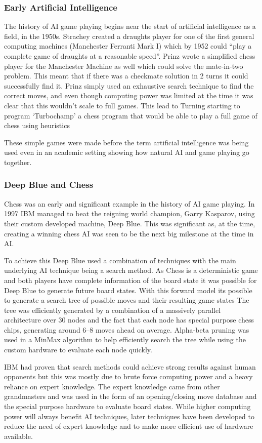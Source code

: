 \documentclass[a4paper]{article}
\begin{document}
\subsubsection{Early Artificial Intelligence}
The history of AI game playing begins near the start of artificial intelligence as a field, in the 1950s.
Strachey created a draughts player for one of the first general computing machines (Manchester Ferranti Mark I) which by  1952 could ``play a complete game of draughts at a reasonable speed''\cite{BreifHistoryComputing}.
Prinz wrote a simplified chess player for the Manchester Machine as well which could solve the mate-in-two problem.
This meant that if there was a checkmate solution in 2 turns it could successfully find it\cite{BreifHistoryComputing}.
Prinz simply used an exhaustive search technique to find the correct moves, and even though computing power was limited at the time it was clear that this wouldn't scale to full games.
This lead to Turning starting to program `Turbochamp' a chess program that would be able to play a full game of chess using heuristics\cite{BreifHistoryComputing}
\par
These simple games were made before the term artificial intelligence was being used even in an academic setting showing how natural AI and game playing go together.

\subsubsection{Deep Blue and Chess}
Chess was an early and significant example in the history of AI game playing.
In 1997 IBM managed to beat the reigning world champion, Garry Kasparov, using their custom developed machine, Deep Blue\cite{deepBlue}.
This was significant as, at the time, creating a winning chess AI was seen to be the next big milestone at the time in AI\@.
\par
To achieve this Deep Blue used a combination of techniques with the main underlying AI technique being a search method.
As Chess is a deterministic game and both players have complete information of the board state it was possible for Deep Blue to generate future board states.
With this forward model its possible to generate a search tree of possible moves and their resulting game states
The tree was efficiently generated by a combination of a massively parallel architecture over 30 nodes and the fact that each node has special purpose chess chips, generating around 6--8 moves ahead on average.
Alpha-beta pruning was used in a MinMax algorithm to help efficiently search the tree while using the custom hardware to evaluate each node quickly.
\par
IBM had proven that search methods could achieve strong results against human opponents but this was mostly due to brute force computing power and a heavy reliance on expert knowledge.
The expert knowledge came from other grandmasters and was used in the form of an opening/closing move database and the special purpose hardware to evaluate board states.
While higher computing power will always benefit AI techniques, later techniques have been developed to reduce the need of expert knowledge and to make more efficient use of hardware available.
\end{document}
